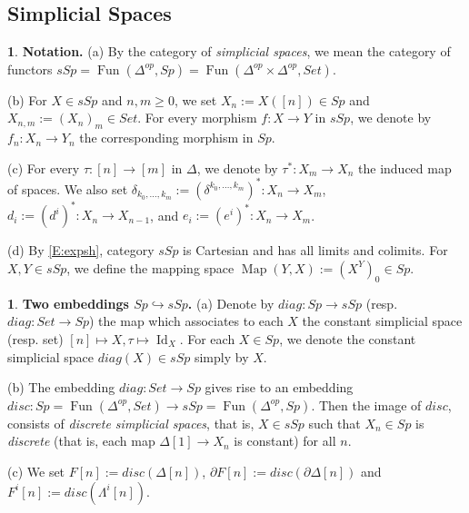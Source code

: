 \documentclass[12pt]{amsart}
\theoremstyle{plain}
\theoremstyle{definition}
\newtheorem{Def}[Thm]{Definition}
\newtheorem{Emp}[Thm]{}
\numberwithin{equation}{section}
\newcommand{\La}{\Lambda}
\newcommand{\hra}{\hookrightarrow}
\newcommand{\dt}{\delta}
\newcommand{\Dt}{\Delta}
\newcommand{\re}[1]{\ref{E:#1}}
\newcommand{\Map}{\operatorname{Map}}
\newcommand{\Fun}{\operatorname{Fun}}
\newcommand{\p}{\partial}
\newcommand{\Id}{\operatorname{Id}}
\begin{document}























\subsection{Simplicial Spaces}










\begin{Emp} \label{E:ssp}
{\bf Notation.} (a) By the category of {\em simplicial spaces}, we
mean the category of functors
$sSp=\Fun(\Dt^{op},Sp)=\Fun(\Dt^{op}\times\Dt^{op},Set)$.

(b) For $X\in sSp$ and $n,m\geq 0$, we set $X_n:=X([n])\in Sp$
and $X_{n,m}:=(X_n)_m\in Set$. For every morphism $f:X\to Y$ in
$sSp$, we denote by $f_n:X_n\to Y_n$ the corresponding morphism in
$Sp$.

(c) For every $\tau:[n]\to[m]$ in $\Dt$, we denote by
$\tau^*:X_m\to X_n$ the induced map of spaces. We also set
$\dt_{k_0,\ldots,k_m}:=(\dt^{k_0,\ldots,k_m})^*:X_n\to X_m$,
$d_i:=(d^i)^*:X_n\to X_{n-1}$, and $e_i:=(e^i)^*:X_n\to X_m$.

(d) By \re{expsh}, category $sSp$ is Cartesian and has all limits
and colimits. For $X,Y\in sSp$, we define the mapping space
$\Map(Y,X):=(X^Y)_0\in Sp$.
\end{Emp}

\begin{Emp}
{\bf Two embeddings $Sp\hra sSp$.} (a) Denote by $diag:Sp\to sSp$ (resp. $diag:Set\to Sp$)
the map which associates to each $X$ the constant simplicial
space (resp. set) $[n]\mapsto X,\tau\mapsto\Id_X$.
For each $X\in Sp$, we denote the constant simplicial space $diag(X)\in sSp$ simply by $X$.  

(b) The embedding $diag:Set\to Sp$ gives rise to an embedding
$disc:Sp=\Fun(\Dt^{op},Set)\to sSp=\Fun(\Dt^{op},Sp)$. Then the image of $disc$, 
consists of {\em discrete simplicial spaces}, that is, $X\in sSp$
such that $X_n\in Sp$ is {\em discrete} (that is, each map $\Dt[1]\to
X_n$ is constant) for all $n$.

(c) We set $F[n]:=disc(\Dt[n])$, $\p F[n]:=disc(\p\Dt[n])$ and
$F^i[n]:=disc(\La^i[n])$.
\end{Emp}
\end{document}
